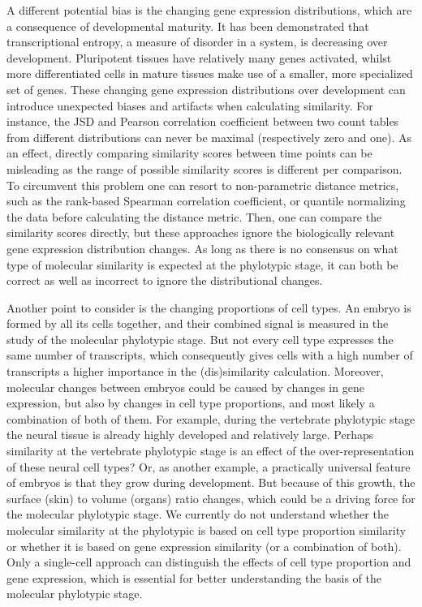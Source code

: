 A different potential bias is the changing gene expression distributions, which are a consequence of developmental maturity. It has been demonstrated that transcriptional entropy, a measure of disorder in a system, is decreasing over development\cite{Kannan2021}. Pluripotent tissues have relatively many genes activated, whilst more differentiated cells in mature tissues make use of a smaller, more specialized set of genes. These changing gene expression distributions over development can introduce unexpected biases and artifacts when calculating similarity. For instance, the JSD and Pearson correlation coefficient between two count tables from different distributions can never be maximal (respectively zero and one). As an effect, directly comparing similarity scores between time points can be misleading as the range of possible similarity scores is different per comparison. To circumvent this problem one can resort to non-parametric distance metrics, such as the rank-based Spearman correlation coefficient\cite{Irie2011}, or quantile normalizing the data before calculating the distance metric\cite{marletaz2018}. Then, one can compare the similarity scores directly, but these approaches ignore the biologically relevant gene expression distribution changes. As long as there is no consensus on what type of molecular similarity is expected at the phylotypic stage, it can both be correct as well as incorrect to ignore the distributional changes. 

Another point to consider is the changing proportions of cell types. An embryo is formed by all its cells together, and their combined signal is measured in the study of the molecular phylotypic stage. But not every cell type expresses the same number of transcripts\cite{Kim2023, Percharde2017}, which consequently gives cells with a high number of transcripts a higher importance in the (dis)similarity calculation. Moreover, molecular changes between embryos could be caused by changes in gene expression, but also by changes in cell type proportions, and most likely a combination of both of them. For example, during the vertebrate phylotypic stage the neural tissue is already highly developed and relatively large. Perhaps similarity at the vertebrate phylotypic stage is an effect of the over-representation of these neural cell types? Or, as another example, a practically universal feature of embryos is that they grow during development. But because of this growth, the surface (skin) to volume (organs) ratio changes, which could be a driving force for the molecular phylotypic stage. We currently do not understand whether the molecular similarity at the phylotypic is based on cell type proportion similarity or whether it is based on gene expression similarity (or a combination of both). Only a single-cell approach can distinguish the effects of cell type proportion and gene expression, which is essential for better understanding the basis of the molecular phylotypic stage.

